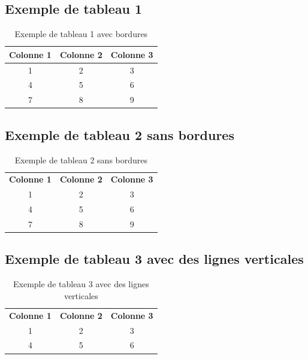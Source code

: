         \subsection{Exemple de tableau 1}
        \begin{table}[h]
            \centering
            \begin{tabular}{|c|c|c|}
            \hline
            \textbf{Colonne 1} & \textbf{Colonne 2} & \textbf{Colonne 3} \\ \hline
            1 & 2 & 3 \\ \hline
            4 & 5 & 6 \\ \hline
            7 & 8 & 9 \\ \hline
            \end{tabular}
            \caption{Exemple de tableau 1 avec bordures}
            \end{table}
        \subsection{Exemple de tableau 2 sans bordures}
            \begin{table}[h]
                \centering
                \begin{tabular}{ccc}
                
                \textbf{Colonne 1} & \textbf{Colonne 2} & \textbf{Colonne 3} \\ 
                1 & 2 & 3 \\ 
                4 & 5 & 6 \\ 
                7 & 8 & 9 \\ 
                
                \end{tabular}
                \caption{Exemple de tableau 2 sans bordures}
                \end{table}
            \subsection{Exemple de tableau 3 avec des lignes verticales}
            \begin{table}[h]
                \centering
                \begin{tabular}{|c|c|c|}
                \textbf{Colonne 1} & \textbf{Colonne 2} & \textbf{Colonne 3} \\ 
                1 & 2 & 3 \\ 
                4 & 5 & 6 \\ 
                \end{tabular}
                \caption{Exemple de tableau 3 avec des lignes verticales}
                \end{table}
